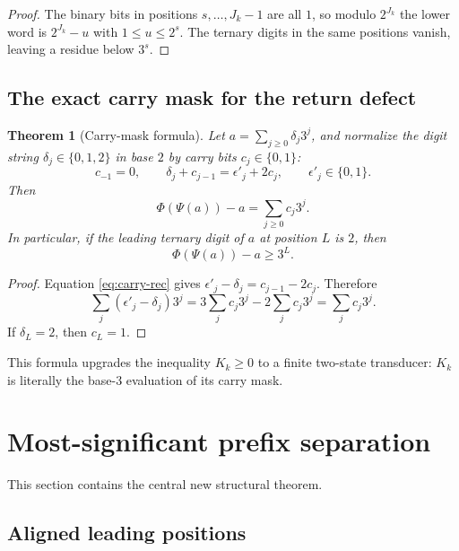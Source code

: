 \documentclass[11pt]{article}
\newtheorem{theorem}{Theorem}[section]
\theoremstyle{definition}
\begin{document}
\begin{proof}
The binary bits in positions \(s,\ldots,J_k-1\) are all \(1\), so modulo
\(2^{J_k}\) the lower word is \(2^{J_k}-u\) with \(1\le u\le2^s\).
The ternary digits in the same positions vanish, leaving a residue below
\(3^s\).
\end{proof}

\subsection{The exact carry mask for the return defect}

\begin{theorem}[Carry-mask formula]\label{thm:carry-mask}
Let \(a=\sum_{j\ge0}\delta_j3^j\), and normalize the digit string
\(\delta_j\in\{0,1,2\}\) in base \(2\) by carry bits \(c_j\in\{0,1\}\):
\begin{equation}\label{eq:carry-rec}
 c_{-1}=0,
 \qquad
 \delta_j+c_{j-1}=\epsilon'_j+2c_j,
 \qquad \epsilon'_j\in\{0,1\}.
\end{equation}
Then
\begin{equation}\label{eq:K-carry-mask}
 \Phi(\Psi(a))-a=\sum_{j\ge0}c_j3^j.
\end{equation}
In particular, if the leading ternary digit of \(a\) at position \(L\) is
\(2\), then
\begin{equation}\label{eq:K-top2}
 \Phi(\Psi(a))-a\ge3^L.
\end{equation}
\end{theorem}

\begin{proof}
Equation \cref{eq:carry-rec} gives
\(\epsilon'_j-\delta_j=c_{j-1}-2c_j\).  Therefore
\[
 \sum_j(\epsilon'_j-\delta_j)3^j
 =3\sum_jc_j3^j-2\sum_jc_j3^j
 =\sum_jc_j3^j.
\]
If \(\delta_L=2\), then \(c_L=1\).
\end{proof}

This formula upgrades the inequality \(K_k\ge0\) to a finite two-state
transducer: \(K_k\) is literally the base-3 evaluation of its carry mask.

\section{Most-significant prefix separation}
\label{sec:prefix}

This section contains the central new structural theorem.

\subsection{Aligned leading positions}
\end{document}

